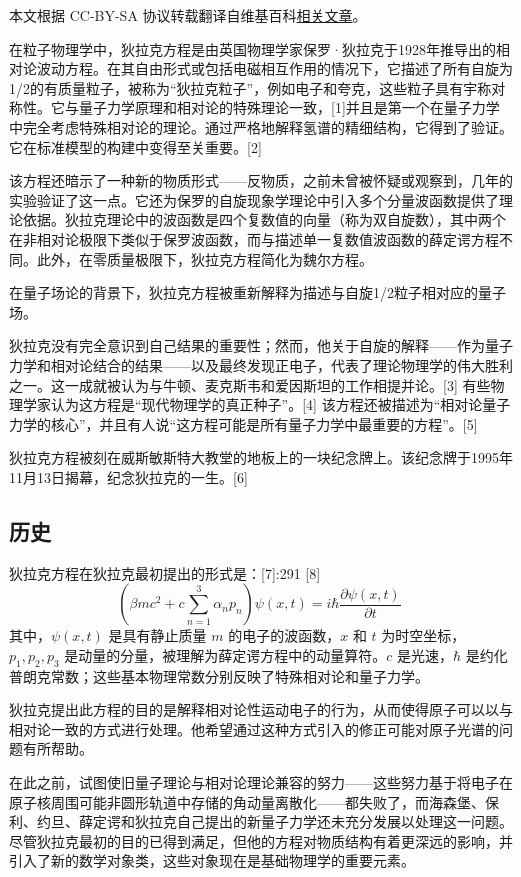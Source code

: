 
本文根据 CC-BY-SA 协议转载翻译自维基百科\href{https://en.wikipedia.org/wiki/Dirac_equation}{相关文章}。

在粒子物理学中，狄拉克方程是由英国物理学家保罗·狄拉克于1928年推导出的相对论波动方程。在其自由形式或包括电磁相互作用的情况下，它描述了所有自旋为1/2的有质量粒子，被称为“狄拉克粒子”，例如电子和夸克，这些粒子具有宇称对称性。它与量子力学原理和相对论的特殊理论一致，[1]并且是第一个在量子力学中完全考虑特殊相对论的理论。通过严格地解释氢谱的精细结构，它得到了验证。它在标准模型的构建中变得至关重要。[2]

该方程还暗示了一种新的物质形式——反物质，之前未曾被怀疑或观察到，几年的实验验证了这一点。它还为保罗的自旋现象学理论中引入多个分量波函数提供了理论依据。狄拉克理论中的波函数是四个复数值的向量（称为双自旋数），其中两个在非相对论极限下类似于保罗波函数，而与描述单一复数值波函数的薛定谔方程不同。此外，在零质量极限下，狄拉克方程简化为魏尔方程。

在量子场论的背景下，狄拉克方程被重新解释为描述与自旋1/2粒子相对应的量子场。

狄拉克没有完全意识到自己结果的重要性；然而，他关于自旋的解释——作为量子力学和相对论结合的结果——以及最终发现正电子，代表了理论物理学的伟大胜利之一。这一成就被认为与牛顿、麦克斯韦和爱因斯坦的工作相提并论。[3] 有些物理学家认为这方程是“现代物理学的真正种子”。[4] 该方程还被描述为“相对论量子力学的核心”，并且有人说“这方程可能是所有量子力学中最重要的方程”。[5]

狄拉克方程被刻在威斯敏斯特大教堂的地板上的一块纪念牌上。该纪念牌于1995年11月13日揭幕，纪念狄拉克的一生。[6]

\subsection{历史}
狄拉克方程在狄拉克最初提出的形式是：[7]:291 [8]
\[
\left( \beta mc^{2} + c \sum_{n=1}^{3} \alpha_{n} p_{n} \right) \psi(x,t) = i\hbar \frac{\partial \psi(x,t)}{\partial t}~
\]
其中，\(\psi(x,t)\) 是具有静止质量 \(m\) 的电子的波函数，\(x\) 和 \(t\) 为时空坐标，\(p_1, p_2, p_3\) 是动量的分量，被理解为薛定谔方程中的动量算符。\(c\) 是光速，\(\hbar\) 是约化普朗克常数；这些基本物理常数分别反映了特殊相对论和量子力学。

狄拉克提出此方程的目的是解释相对论性运动电子的行为，从而使得原子可以以与相对论一致的方式进行处理。他希望通过这种方式引入的修正可能对原子光谱的问题有所帮助。

在此之前，试图使旧量子理论与相对论理论兼容的努力——这些努力基于将电子在原子核周围可能非圆形轨道中存储的角动量离散化——都失败了，而海森堡、保利、约旦、薛定谔和狄拉克自己提出的新量子力学还未充分发展以处理这一问题。尽管狄拉克最初的目的已得到满足，但他的方程对物质结构有着更深远的影响，并引入了新的数学对象类，这些对象现在是基础物理学的重要元素。

